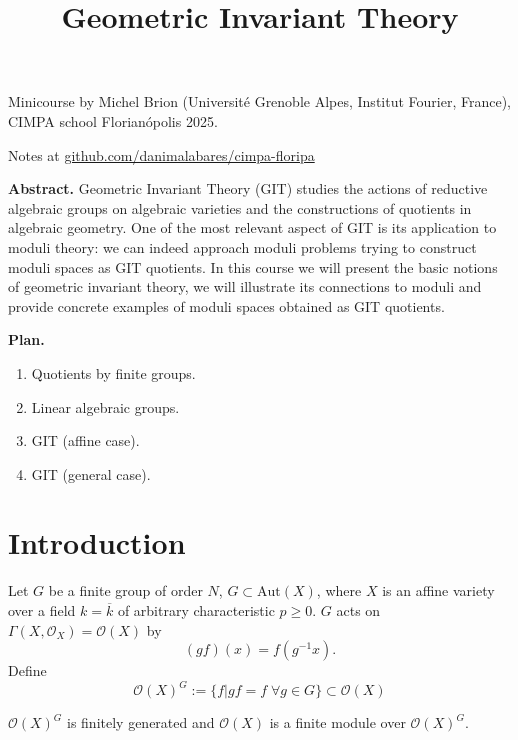 


\title{Geometric Invariant Theory}
\maketitle

\noindent
Minicourse by Michel Brion 
(Université Grenoble Alpes, Institut Fourier, France), 
CIMPA school Florianópolis 2025.

\medskip\noindent
Notes at 
\href{http:/\!/github.com/danimalabares/cimpa-floripa}
{github.com/danimalabares/cimpa-floripa}

\bigskip\noindent

{\bf Abstract.} Geometric Invariant Theory (GIT) studies the actions of
reductive algebraic groups on algebraic varieties and the constructions of
quotients in algebraic geometry. One of the most relevant aspect of GIT is its
application to moduli theory: we can indeed approach moduli problems trying to
construct moduli spaces as GIT quotients. In this course we will present the
basic notions of geometric invariant theory, we will illustrate its connections
to moduli and provide concrete examples of moduli spaces obtained as GIT
quotients. 

\bigskip\noindent
\tableofcontents
\bigskip\noindent

{\bf Plan.}

\begin{enumerate}
\item Quotients by finite groups.
\item Linear algebraic groups.
\item GIT (affine case).
\item GIT (general case).
\end{enumerate}

\section{Introduction}
\label{section-introduction}

Let $G$ be a finite group of order $N$, $G \subset \text{Aut}(X)$,  where $X$ is
an affine variety over a field  $k=\overline{k}$ of arbitrary characteristic 
$p \geq 0$. $G$ acts on $\Gamma(X,\mathcal{O}_X)=\mathcal{O}(X)$ by
$$
(gf)(x)=f(g^{-1}x).
$$
Define
$$
\mathcal{O}(X)^G:=\{f|gf=f\;\forall g \in G\}\subset\mathcal{O}(X)
$$

\begin{proposition}
\label{proposition-OXG-is-finitely-generated}
$\mathcal{O}(X)^G$ is finitely generated and $\mathcal{O}(X)$ is a finite module
over $\mathcal{O}(X)^G$.
\end{proposition}

